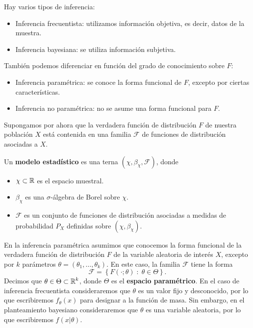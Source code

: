 Hay varios tipos de inferencia:
\begin{itemize}
\item Inferencia frecuentista: utilizamos información objetiva, es decir, datos de la muestra.
\item Inferencia bayesiana: se utiliza información subjetiva.
\end{itemize}
También podemos diferenciar en función del grado de conocimiento sobre $\displaystyle F $:
\begin{itemize}
\item Inferencia paramétrica: se conoce la forma funcional de $\displaystyle F $, excepto por ciertas características.
\item Inferencia no paramétrica: no se asume una forma funcional para $\displaystyle F $.
\end{itemize}
Supongamos por ahora que la verdadera función de distribución $\displaystyle F $ de nuestra población $\displaystyle X $ está contenida en una familia $\displaystyle \mathcal{F} $ de funciones de distribución asociadas a $\displaystyle X $.
\begin{definition}
Un \textbf{modelo estadístico} es una terna $\displaystyle \left(\chi, \beta_{\chi}, \mathcal{F}\right) $, donde 
\begin{itemize}
\item $\displaystyle \chi \subset \mathbb{R} $ es el espacio muestral.
\item $\displaystyle \beta_{\chi} $ es una $\displaystyle \sigma  $-álgebra de Borel sobre $\displaystyle \chi $. 
\item $\displaystyle \mathcal{F} $ es un conjunto de funciones de distribución asociadas a medidas de probabilidad $\displaystyle P_{X} $ definidas sobre $\displaystyle \left(\chi, \beta_{\chi}\right) $.
\end{itemize}
\end{definition}
En la inferencia paramétrica asumimos que conocemos la forma funcional de la verdadera función de distribución $\displaystyle F $ de la variable aleatoria de interés $\displaystyle X $, excepto por $\displaystyle k $ parámetros $\displaystyle \theta = \left(\theta_{1}, \ldots, \theta_{k}\right) $. En este caso, la familia $\displaystyle \mathcal{F} $ tiene la forma
\[\mathcal{F}= \left\{ F\left( \cdot; \theta \right) \; : \; \theta \in \Theta\right\}  .\]
Decimos que $\displaystyle \theta \in \Theta \subset \mathbb{R}^{k}$, donde $\displaystyle \Theta $ es el \textbf{espacio paramétrico}. En el caso de inferencia frecuentista consideraremos que $\displaystyle \theta $ es un valor fijo y desconocido, por lo que escribiremos $\displaystyle f_{\theta}\left(x\right) $ para designar a la función de masa. Sin embargo, en el planteamiento bayesiano consideraremos que $\displaystyle \theta $ es una variable aleatoria, por lo que escribiremos $\displaystyle f\left(x | \theta \right) $. 
